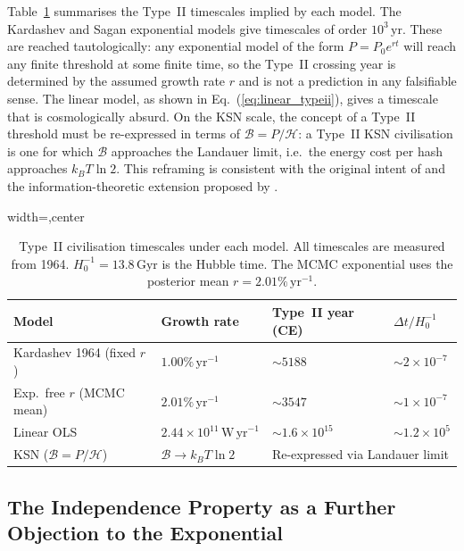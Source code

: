 \documentclass[final,5p,times,twocolumn,authoryear]{elsarticle}
\begin{document}
Table~\ref{tab:timescales} summarises the Type~II timescales implied by each
model. The Kardashev and Sagan exponential models give timescales of order
$10^3\,\mathrm{yr}$. These are reached tautologically: any exponential model
of the form $P = P_0 e^{rt}$ will reach any finite threshold at some finite
time, so the Type~II crossing year is determined by the assumed growth rate
$r$ and is not a prediction in any falsifiable sense. The linear model, as
shown in Eq.~(\ref{eq:linear_typeii}), gives a timescale that is
cosmologically absurd. On the KSN scale, the concept of a Type~II threshold
must be re-expressed in terms of $\mathscr{B} = P/\mathcal{H}$: a Type~II KSN civilisation is
one for which $\mathscr{B}$ approaches the Landauer limit, i.e.\ the energy cost per
hash approaches $k_B T \ln 2$. This reframing is consistent with the original
intent of \citet{kar64} and the information-theoretic extension
proposed by \citet{sagan73}.
 
\begin{table}[t]
\centering
\caption{Type~II civilisation timescales under each model. All timescales
are measured from 1964. $H_0^{-1} = 13.8\,\mathrm{Gyr}$ is the Hubble time.
The MCMC exponential uses the posterior mean $r = 2.01\%\,\mathrm{yr}^{-1}$.}
\label{tab:timescales}
\begin{adjustbox}{width=\textwidth,center}
\begin{tabular}{l l l l}
\toprule
Model & Growth rate & Type~II year (CE) & $\Delta t / H_0^{-1}$ \\
\midrule
Kardashev 1964 (fixed $r$)  & $1.00\%\,\mathrm{yr}^{-1}$ & $\sim 5188$ & $\sim 2 \times 10^{-7}$ \\
Exp.\ free $r$ (MCMC mean)  & $2.01\%\,\mathrm{yr}^{-1}$ & $\sim 3547$ & $\sim 1 \times 10^{-7}$ \\
Linear OLS                  & $2.44 \times 10^{11}\,\mathrm{W\,yr}^{-1}$ & $\sim 1.6 \times 10^{15}$ & $\sim 1.2 \times 10^{5}$ \\
KSN ($\mathscr{B} = P/\mathcal{H}$)             & $\mathscr{B} \to k_B T \ln 2$ & \multicolumn{2}{l}{Re-expressed via Landauer limit} \\
\bottomrule
\end{tabular}
\end{adjustbox}
\end{table}
 
\subsection{The Independence Property as a Further Objection to the Exponential}
\label{sec:memoryless}
 
\end{document}
